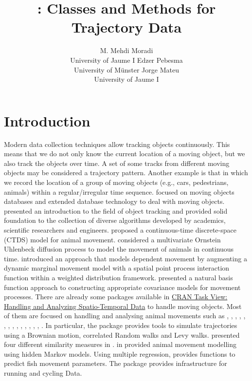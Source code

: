 \documentclass[article]{jss}
\author{M. Mehdi Moradi\\University of Jaume I
    \And Edzer Pebesma\\University of M\"unster
    \And Jorge Mateu\\University of Jaume I}
\title{\pkg{trajectories}: Classes and Methods for Trajectory Data}
\begin{document}
\section[Introduction]{Introduction}\label{sec:intro}
Modern data collection techniques allow tracking objects continuously. This means that we do not only know the current location of a moving object, but we also track the objects over time. A set of some tracks from different moving objects may be considered a trajectory pattern. Another example is that in which we record the location of a group of moving objects (e.g., cars, pedestrians, animals) within a regular/irregular time sequence. \cite{guting05} focused on moving objects databases and extended database technology to deal with moving objects. \cite{challa2011} presented an introduction to the field of object tracking and provided solid foundation to the collection of diverse algorithms developed by academics, scientific researchers and engineers. \cite{hanks15} proposed a continuous-time discrete-space (CTDS) model for animal movement. \cite{niu2016modeling} considered a multivariate Ornstein Uhlenbeck diffusion process to model the movement of animals in continuous time. \cite{russell16} introduced an approach that models dependent movement by augmenting a dynamic marginal movement model with a spatial point process interaction function within a weighted distribution framework. \cite{hooten17} presented a natural basis function approach to constructing appropriate covariance models for movement processes. There are already some  packages available in \href{https://cran.r-project.org}{CRAN Task View: Handling and Analyzing Spatio-Temporal Data} to handle moving objects. Most of them are focused on handling and analysing animal movements such as  \citep{calenge06},  \citep{sumner2009},  \citep{argosf},  \citep{V-Track},  \citep{animalTrack},  \citep{BBMM},  \citep{bcpa},  \citep{BayesianAnimalTracker},  \citep{TrackReconstruction},  \citep{mkde},  \citep{SimilarityMeasures},  \citep{smam}, \citep{trip},  \citep{moveHMM},  \citep{FLightR}. In particular, the package  \citep{calenge06} provides tools to simulate trajectories using a Brownian motion, correlated Random walks and Levy walks. \cite{SimilarityMeasures} presented four different similarity measures in . \cite{moveHMM} in  provided animal movement modelling using hidden Markov models. Using multiple regression,  \citep{fishmove}  provides functions to predict fish movement parameters. The  package  \citep{frick} provides infrastructure for running and cycling Data.
\end{document}

